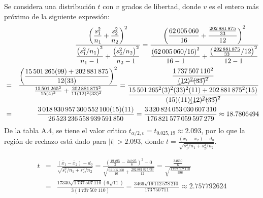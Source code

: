 \begin{solucion}
 \begin{region}
  Se considera una distribuci\'on $t$ con $v$ grados de libertad,
  donde $v$ es el entero m\'as pr\'oximo
  de la siguiente expresi\'on:
  \begin{eqnarray*}
   & & \frac{\displaystyle{
   \left( \frac{s_1^2}{n_1} + \frac{s_2^2}{n_2} \right)^2
   }}{\displaystyle{
   \frac{\left( s_1^2/n_1 \right)^2}{n_1 - 1} +
   \frac{\left( s_2^2/n_2 \right)^2}{n_2 - 1}
   }}
   = \frac{\displaystyle{
   \left( \frac{62\,005\,060}{16} + 
   \frac{\frac{202\,881\,875}{33}}{12} \right)^2
   }}{\displaystyle{
   \frac{\left( 62\,005\,060/16 \right)^2}{16 - 1} +
   \frac{\left( \frac{202\,881\,875}{33}/12 \right)^2}{12 - 1}
   }} \\
   & = & \frac{\displaystyle{
   \left( \frac{15\,501\,265(99) + 202\,881\,875}{12(33)} \right)^2
   }}{
   \frac{15\,501\,265^2}{15(4)^2} +
   \frac{202\,881\,875^2}{11(12)^2(33)^2}
   }
   = \frac{
   \displaystyle{\frac{1\,737\,507\,110^2}{\cancel{(12)^2(33)^2}}}
   }{\displaystyle{
   \frac{
   15\,501\,265^2(3)^2(33)^2(11) + 202\,881\,875^2(15)
   }{
   (15)(11)\cancel{(12)^2(33)^2}
   }
   }} \\
   & = & \frac{
   3\,018\,930\,957\,300\,552\,100(15)(11)
   }{
   26\,523\,236\,558\,939\,591\,850
   }
   = \frac{
   3\,320\,824\,053\,030\,607\,310
   }{
   176\,821\,577\,059\,597\,279
   }
   \approx 18.7806494
  \end{eqnarray*}
  De la tabla A.4, se tiene el valor cr\'{\i}tico
  $t_{\alpha/2,v} = t_{0.025,19} \approx 2.093$,
  por lo que la regi\'on de rechazo est\'a dado para $|t| > 2.093$,
  donde $t = \frac{
  \left( \bar{x}_1 - \bar{x}_2 \right) - d_0
  }{
  \sqrt{s_1^2/n_1 + s_2^2/n_2}
  }$.
 \end{region}

 \begin{estadistico}
  \begin{eqnarray*}
   t & = & \frac{
   \left( \bar{x}_1 - \bar{x}_2 \right) - d_0
   }{
   \sqrt{s_1^2/n_1 + s_2^2/n_2}
   }
   = \frac{
   \left( \frac{19\,795}{2} - \frac{24\,725}{6} \right)^2 - 0
   }{
   \sqrt{\frac{62\,005\,060}{16} + \frac{202\,881\,875/33}{12}}
   }
   = \frac{\frac{34660}{6}}{\sqrt{\frac{1\,737\,507\,110}{396}}} \\
   & = & \frac{17330\sqrt{1\,737\,507\,110}\left( 6\sqrt{11} \right)}{3(1\,737\,507\,110)}
   = \frac{3466\sqrt{19\,112\,578\,210}}{173\,750\,711}
   \approx 2.757792624
  \end{eqnarray*}
 \end{estadistico}


\end{solucion}
